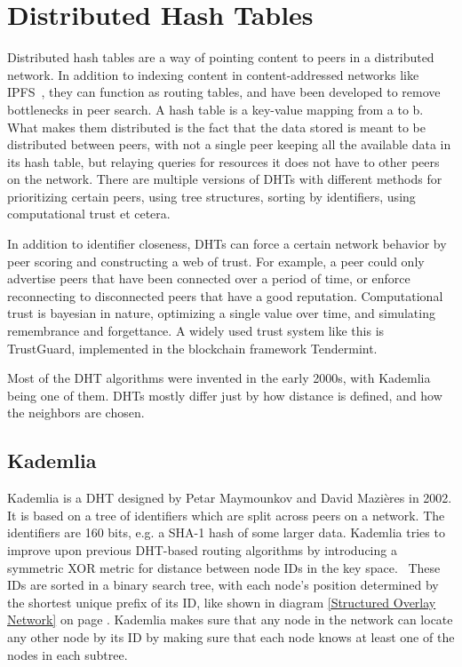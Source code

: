 \section{Distributed Hash Tables}
Distributed hash tables are a way of pointing content to peers in a distributed network. In addition to indexing content in content-addressed networks like IPFS~\cite{Labs_undated-uw}, they can function as routing tables, and have been developed to remove bottlenecks in peer search. A hash table is a key-value mapping from a to b. What makes them distributed is the fact that the data stored is meant to be distributed between peers, with not a single peer keeping all the available data in its hash table, but relaying queries for resources it does not have to other peers on the network. There are multiple versions of DHTs with different methods for prioritizing certain peers, using tree structures, sorting by identifiers, using computational trust et cetera.

In addition to identifier closeness, DHTs can force a certain network behavior by peer scoring and constructing a web of trust. For example, a peer could only advertise peers that have been connected over a period of time, or enforce reconnecting to disconnected peers that have a good reputation. Computational trust is bayesian in nature, optimizing a single value over time, and simulating remembrance and forgettance. A widely used trust system like this is TrustGuard, implemented in the blockchain framework Tendermint.~\cite{Srivatsa2005-ib, Jeff_Foley2018-zt}

Most of the DHT algorithms were invented in the early 2000s, with Kademlia being one of them. DHTs mostly differ just by how distance is defined, and how the neighbors are chosen.~\cite{Cai2015-ra}

\subsection{Kademlia}
Kademlia is a DHT designed by Petar Maymounkov and David Mazières in 2002. It is based on a tree of identifiers which are split across peers on a network. The identifiers are 160 bits, e.g. a SHA-1 hash of some larger data. Kademlia tries to improve upon previous DHT-based routing algorithms by introducing a symmetric XOR metric for distance between node IDs in the key space.~\cite{Petar_Maymounkov2020-sx} These IDs are sorted in a binary search tree, with each node's position determined by the shortest unique prefix of its ID, like shown in diagram \ref{Structured Overlay Network} on page \pageref{Structured Overlay Network}. Kademlia makes sure that any node in the network can locate any other node by its ID by making sure that each node knows at least one of the nodes in each subtree.

